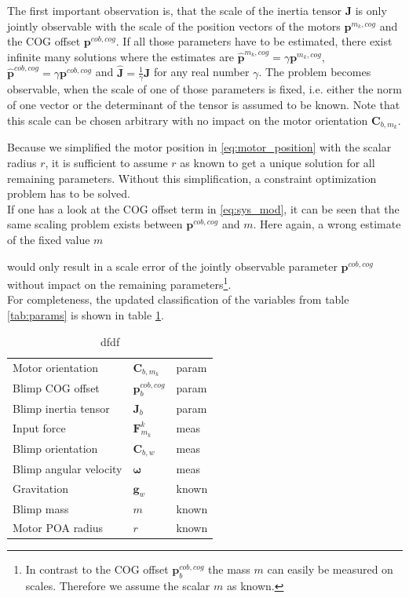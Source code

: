 The first important observation is, that the scale of the inertia tensor $\mathbf{J}$ is only jointly observable with the scale of the position vectors of the motors $\mathbf{p}^{m_k,cog}$ and the COG offset $\mathbf{p}^{cob,cog}$.
If all those parameters have to be estimated, there exist infinite many solutions where the estimates are $\hat{\mathbf{p}}^{m_k,cog} = \gamma \mathbf{p}^{m_k,cog}$, 
$\hat{\mathbf{p}}^{cob,cog} = \gamma \mathbf{p}^{cob,cog}$ and 
$\hat{\mathbf{J}}           = \frac{1}{\gamma} \mathbf{J}$
for any real number $\gamma$.
The problem becomes observable, when the scale of one of those parameters is fixed, i.e. either the norm of one vector or the determinant of the tensor is assumed to be known.
Note that this scale can be chosen arbitrary with no impact on the motor orientation $\mathbf{C}_{b,m_k}$.

Because we simplified the motor position in \eqref{eq:motor_position} with the scalar radius $r$, it is sufficient to assume $r$ as known to get a unique solution for all remaining parameters.
Without this simplification, a constraint optimization problem has to be solved.
\\

If one has a look at the COG offset term in \eqref{eq:sys_mod}, it can be seen that the same scaling problem exists between $\mathbf{p}^{cob,cog}$ and $m$.
Here again, a wrong estimate of the fixed value $m$

would only result in a scale error of the jointly observable parameter $\mathbf{p}^{cob,cog}$ without impact on the remaining parameters\footnote{
In contrast to the COG offset $\mathbf{p}^{cob,cog}_{b}$ the mass $m$ can easily be measured on scales. Therefore we assume the scalar $m$ as known.}.
\\
For completeness, the updated classification of the variables from table \ref{tab:params} is shown in table \ref{tab:params_updated}.

\begin{table}[htb!]
\label{tab:params_updated}
\centering
\begin{tabular}{lll}
\hline
Motor orientation & $\mathbf{C}_{b,m_k}$ & param \\
Blimp COG offset & $\mathbf{p}^{cob,cog}_b$ & param \\
Blimp inertia tensor & $\mathbf{J}_b$ & param \\
Input force & $\mathbf{F}_{m_k}^k$ & meas \\
Blimp orientation & $\mathbf{C}_{b,w}$ & meas \\
Blimp angular velocity & $\boldsymbol{\omega}$ & meas \\
Gravitation & $\mathbf{g}_w$ & known \\
Blimp mass & $m$ & known \\
Motor POA radius & $r$ & known \\
\hline
\end{tabular}
\caption{dfdf}
\end{table}


